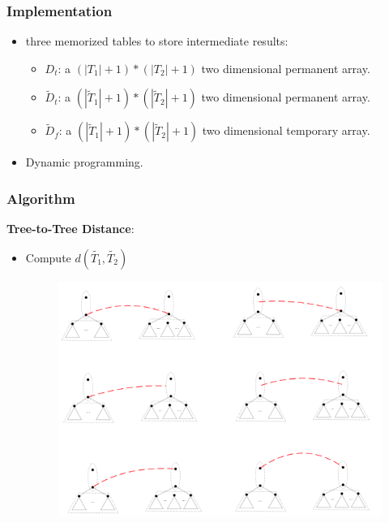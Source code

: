 \documentclass{beamer}
\begin{document}
\begin{frame}
\frametitle{Implementation}
\begin{itemize}
\item three memorized tables to store intermediate results:
\begin{itemize}
\item $D_t$: a $(\left\vert T_1 \right\vert + 1) * (\left\vert T_2 \right\vert + 1)$ two dimensional permanent array.
\item $\widetilde{D}_t$: a $(\left\vert \widetilde{T}_1 \right\vert + 1) * (\left\vert \widetilde{T}_2 \right\vert + 1)$ two dimensional permanent array.
\item $\widetilde{D}_f$: a $(\left\vert \widetilde{T}_1 \right\vert + 1) * (\left\vert \widetilde{T}_2 \right\vert  + 1)$ two dimensional temporary array.
\end{itemize}
\item Dynamic programming.
\end{itemize}
\end{frame}
\begin{frame}
\frametitle{Algorithm}
\textbf{Tree-to-Tree Distance}:
\begin{itemize}
\item Compute $d(\widetilde{T_1}, \widetilde{T_2})$
\begin{figure}
	\includegraphics[width=0.85\linewidth]{treetreecompressed}
	\centering
\end{figure}
\end{itemize}
\end{frame}
\end{document}
